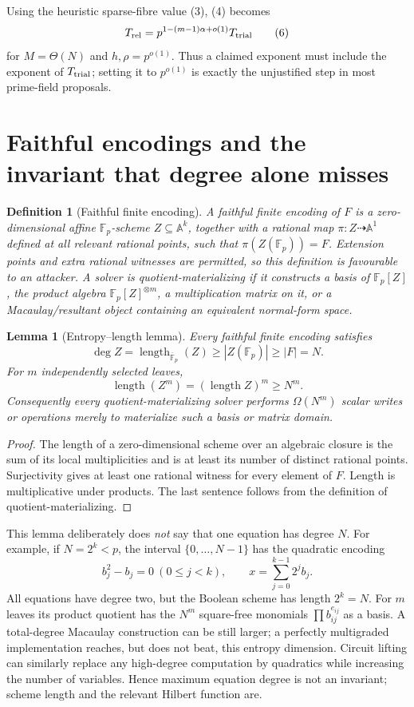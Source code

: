 \documentclass[11pt]{article}
\newtheorem{lemma}[theorem]{Lemma}
\newtheorem{definition}[theorem]{Definition}
\newcommand{\F}{\mathbb F}
\newcommand{\A}{\mathbb A}
\newcommand{\length}{\operatorname{length}}
\begin{document}
Using the heuristic sparse-fibre value (3), (4) becomes
\[
 T_{\rm rel}=p^{1-(m-1)\alpha+o(1)}T_{\rm trial}                    \tag{6}
\]
for $M=\Theta(N)$ and $h,\rho=p^{o(1)}$.  Thus a claimed exponent must include
the exponent of $T_{\rm trial}$; setting it to $p^{o(1)}$ is exactly the
unjustified step in most prime-field proposals.

\section{Faithful encodings and the invariant that degree alone misses}

\begin{definition}[Faithful finite encoding]
A faithful finite encoding of $F$ is a zero-dimensional affine $\F_p$-scheme
$Z\subseteq\A^k$, together with a rational map $\pi:Z\dashrightarrow\A^1$
defined at all relevant rational points, such that $\pi(Z(\F_p))=F$.  Extension
points and extra rational witnesses are permitted, so this definition is
favourable to an attacker.  A solver is \emph{quotient-materializing} if it
constructs a basis of $\F_p[Z]$, the product algebra $\F_p[Z]^{\otimes m}$, a
multiplication matrix on it, or a Macaulay/resultant object containing an
equivalent normal-form space.
\end{definition}

\begin{lemma}[Entropy--length lemma]\label{lem:length}
Every faithful finite encoding satisfies
\[
 \deg Z=\length_{\overline{\F}_p}(Z)\ge |Z(\F_p)|\ge |F|=N.          \tag{7}
\]
For $m$ independently selected leaves,
\[
 \length(Z^m)=(\length Z)^m\ge N^m.                                 \tag{8}
\]
Consequently every quotient-materializing solver performs
$\Omega(N^m)$ scalar writes or operations merely to materialize such a basis
or matrix domain.
\end{lemma}

\begin{proof}
The length of a zero-dimensional scheme over an algebraic closure is the sum
of its local multiplicities and is at least its number of distinct rational
points.  Surjectivity gives at least one rational witness for every element of
$F$.  Length is multiplicative under products.  The last sentence follows
from the definition of quotient-materializing.
\end{proof}

This lemma deliberately does \emph{not} say that one equation has degree $N$.
For example, if $N=2^k<p$, the interval $\{0,\ldots,N-1\}$ has the quadratic
encoding
\[
 b_j^2-b_j=0\ (0\le j<k),\qquad
 x=\sum_{j=0}^{k-1}2^jb_j.                                          \tag{9}
\]
All equations have degree two, but the Boolean scheme has length $2^k=N$.
For $m$ leaves its product quotient has the $N^m$ square-free monomials
$\prod b_{ij}^{e_{ij}}$ as a basis.  A total-degree Macaulay construction can
be still larger; a perfectly multigraded implementation reaches, but does not
beat, this entropy dimension.  Circuit lifting can similarly replace any %
high-degree computation by quadratics while increasing the number of
variables.  Hence maximum equation degree is not an invariant; scheme length
and the relevant Hilbert function are.
\end{document}
